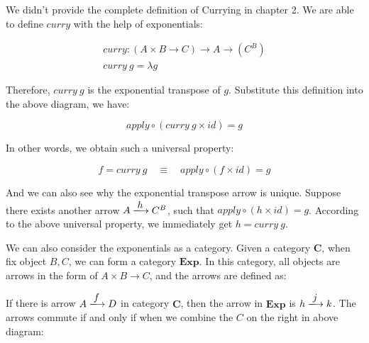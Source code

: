 \documentclass[b5paper]{article}
\begin{document}

We didn't provide the complete definition of Currying in chapter 2. We are able to define $curry$ with the help of exponentials:

\[
\begin{array}{l}
curry : (A \times B \to C) \to A \to (C^B) \\
curry\ g = \lambda g
\end{array}
\]

Therefore, $curry\ g$ is the exponential transpose of $g$. Substitute this definition into the above diagram, we have:

\[
  apply \circ (curry\ g \times id) = g
\]

In other words, we obtain such a universal property:

\[
  f = curry\ g \quad \equiv \quad apply \circ (f \times id) = g
\]

And we can also see why the exponential transpose arrow is unique. Suppose there exists another arrow $A \arrowto{h} C^B$, such that $apply \circ (h \times id) = g$. According to the above universal property, we immediately get $h = curry\ g$.

We can also consider the exponentials as a category. Given a category $\pmb{C}$, when fix object $B, C$, we can form a category $\pmb{Exp}$. In this category, all objects are arrows in the form of $A \times B \to C$, and the arrows are defined as:

\begin{center}
\end{center}

If there is arrow $A \arrowto{f} D$ in category $\pmb{C}$, then the arrow in $\pmb{Exp}$ is $h \arrowto{j} k$. The arrows commute if and only if when we combine the $C$ on the right in above diagram:

\begin{center}
\end{center}
\end{document}

